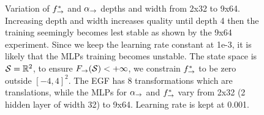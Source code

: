 \documentclass{article}
\theoremstyle{plain}
\theoremstyle{definition}
\theoremstyle{remark}
\theoremstyle{fact}
\begin{document}
\begin{figure}
    \caption{Variation of $f^*_{\rightarrow}$ and $\alpha_{\rightarrow}$ depths and width from 2x32 to 9x64. Increasing depth and width increases quality until depth 4 then the training seemingly becomes lest stable as shown by the 9x64 experiment. Since we keep the learning rate constant at 1e-3, it is likely that the MLPs training becomes unstable.
    The state space is $\mathcal S = \mathbb R^2$,  to ensure $F_{\rightarrow}(\mathcal S)<+\infty$, we constrain $f^*_{\rightarrow}$ to be zero outside $[-4,4]^2$. 
The EGF has 8 transformations which are translations, while the MLPs for $\alpha_{\rightarrow}$ and $f^*_{\rightarrow}$ vary from 2x32 (2 hidden layer of width 32) to 9x64. Learning rate is kept at 0.001.
    }
    \label{fig:toyimg}
\end{figure}


% 
\end{document}
